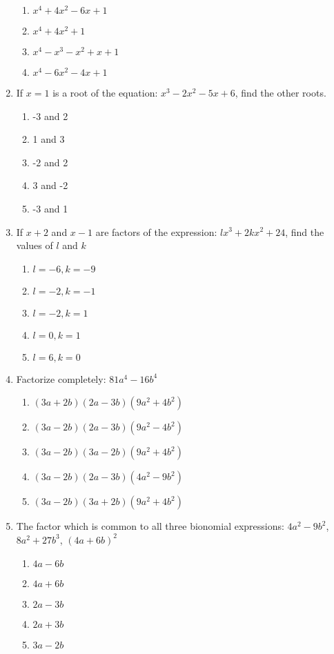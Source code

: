 \begin{multicols}{2}
\begin{enumerate}[label={\arabic*.}]
\begin{enumerate}[label={\Alph*.}]
	\item \(x^4+4{x}^{2}-6x+1\)
	\item \(x^4+4{x}^{2}+1\)
	\item \(x^4-{x}^{3}-{x}^{2}+x+1\)
	\item \(x^4-6{x}^{2}-4x+1\)
	\end{enumerate}
\item If \(x=1\) is a root of the equation: \({x}^{3}-2{x}^{2}-5x+6\), find the other roots.
	\begin{enumerate}[label={\Alph*.}]
	\item -3 and 2
	\item 1 and 3
	\item -2 and 2
	\item 3 and -2
	\item -3 and 1
	\end{enumerate}
\item If \(x+2\) and \(x-1\) are factors of the expression: \(l{x}^{3}+2k{x}^{2}+24\), find the values of \(l\) and \(k\)
	\begin{enumerate}[label={\Alph*.}]
	\item \(l=-6, k=-9\)
	\item \(l=-2, k=-1\)
	\item \(l=-2, k=1\)
	\item \(l=0, k=1\)
	\item \(l=6, k=0\)
	\end{enumerate}
\item Factorize completely: \(81a^4-16b^4\)
	\begin{enumerate}[label={\Alph*.}]
	\item \((3a+2b)(2a-3b)(9a^2+4b^2)\)
	\item \((3a-2b)(2a-3b)(9a^2-4b^2)\)
	\item \((3a-2b)(3a-2b)(9a^2+4b^2)\)
	\item \((3a-2b)(2a-3b)(4a^2-9b^2)\)
	\item \((3a-2b)(3a+2b)(9a^2+4b^2)\)
	\end{enumerate}
\item The factor which is common to all three bionomial expressions: \(4a^2-9b^2\), \(8a^2+27b^3\), \((4a+6b)^2\)
	\begin{enumerate}[label={\Alph*.}]
	\item \(4a-6b\)
	\item \(4a+6b\)
	\item \(2a-3b\)
	\item \(2a+3b\)
	\item \(3a-2b\)
	\end{enumerate}

\end{enumerate}
\end{multicols}
